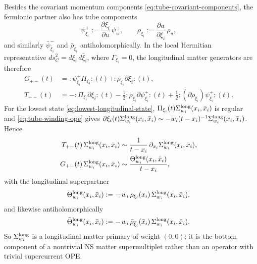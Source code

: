 \documentclass[11pt]{article}
\begin{document}
Besides the covariant momentum components \eqref{eq:tube-covariant-components}, the fermionic partner also has tube components
\begin{equation}\label{eq:tube-fermion-components}
\psi_{\xi_i}^+:=\frac{\partial \xi_i}{\partial u}\,\psi_u^+,
\qquad
\rho_{\xi_i}:=\frac{\partial u}{\partial \xi_i}\,\rho_u,
\end{equation}
and similarly $\bar\psi_{\bar\xi_i}^-$ and $\bar\rho_{\bar\xi_i}$ antiholomorphically. In the local Hermitian representative $ds_C^2=d\xi_i\,d\bar\xi_i$, where $\Gamma_{\xi_i}=0$, the longitudinal matter generators are therefore
\[
\begin{aligned}
G_{+-}(t)
&=
:\!\psi_{\xi_i}^+\Pi_{\xi_i}\!:(t)+:\!\rho_{\xi_i}\partial\xi_i\!:(t),
\\
T_{+-}(t)
&=
-:\!\Pi_{\xi_i}\partial\xi_i\!:(t)-\frac12:\!\rho_{\xi_i}\partial\psi_{\xi_i}^+\!:(t)+\frac12:\!(\partial\rho_{\xi_i})\psi_{\xi_i}^+\!:(t).
\end{aligned}
\]
For the lowest state \eqref{eq:lowest-longitudinal-state}, $\Pi_{\xi_i}(t)\Sigma^{\rm long}_{w_i}(x_i,\bar x_i)$ is regular and \eqref{eq:tube-winding-ope} gives $\partial\xi_i(t)\Sigma^{\rm long}_{w_i}(x_i,\bar x_i)\sim -w_i(t-x_i)^{-1}\Sigma^{\rm long}_{w_i}(x_i,\bar x_i)$. Hence
\begin{equation}\label{eq:longitudinal-primary-ope}
\begin{aligned}
T_{+-}(t)\,\Sigma^{\rm long}_{w_i}(x_i,\bar x_i)
&\sim
\frac{1}{t-x_i}\,
\partial_{x_i}\Sigma^{\rm long}_{w_i}(x_i,\bar x_i),
\\
G_{+-}(t)\,\Sigma^{\rm long}_{w_i}(x_i,\bar x_i)
&\sim
\frac{\Theta^{\rm long}_{w_i}(x_i,\bar x_i)}{t-x_i},
\end{aligned}
\end{equation}
with the longitudinal superpartner
\begin{equation}\label{eq:longitudinal-superpartner}
\Theta^{\rm long}_{w_i}(x_i,\bar x_i)
:=
-\,w_i\,\rho_{\xi_i}(x_i)\,\Sigma^{\rm long}_{w_i}(x_i,\bar x_i),
\end{equation}
and likewise antiholomorphically
\[
\bar\Theta^{\rm long}_{w_i}(x_i,\bar x_i)
:=
-\,w_i\,\bar\rho_{\bar\xi_i}(\bar x_i)\,\Sigma^{\rm long}_{w_i}(x_i,\bar x_i).
\]
So $\Sigma^{\rm long}_{w_i}$ is a longitudinal matter primary of weight $(0,0)$; it is the bottom component of a nontrivial NS matter supermultiplet rather than an operator with trivial supercurrent OPE.
\end{document}
